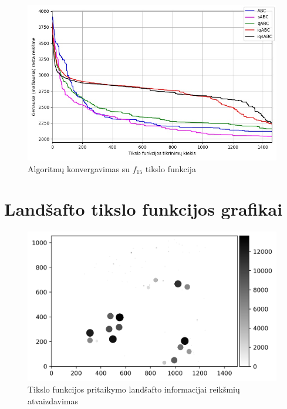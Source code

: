 \documentclass{VUMIFPSmagistrinis}
\begin{document}
\begin{landscape}
\begin{figure}[H]
    \centering
    \includegraphics[scale=0.45]{img/2kv/all_f15.jpg}
    \caption{Algoritmų konvergavimas su $f_{15}$ tikslo funkcija}
    \label{img:konf15}
\end{figure}


\end{landscape}





\section{Landšafto tikslo funkcijos grafikai}\label{PR4goal}

\begin{figure}[H]
    \centering
    \includegraphics[scale=0.8]{img/new/fitres.png}
    \caption{Tikslo funkcijos pritaikymo landšafto informacijai reikšmių atvaizdavimas}
    \label{mapgoalpic}
\end{figure}
\end{document}
